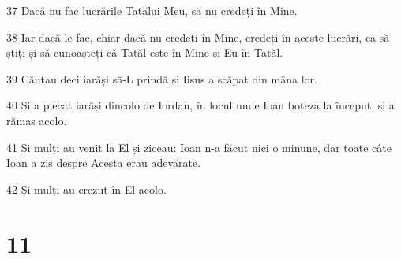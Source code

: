\par 37 Dacă nu fac lucrările Tatălui Meu, să nu credeți în Mine.
\par 38 Iar dacă le fac, chiar dacă nu credeți în Mine, credeți în aceste lucrări, ca să știți și să cunoașteți că Tatăl este în Mine și Eu în Tatăl.
\par 39 Căutau deci iarăși să-L prindă și Iisus a scăpat din mâna lor.
\par 40 Și a plecat iarăși dincolo de Iordan, în locul unde Ioan boteza la început, și a rămas acolo.
\par 41 Și mulți au venit la El și ziceau: Ioan n-a făcut nici o minune, dar toate câte Ioan a zis despre Acesta erau adevărate.
\par 42 Și mulți au crezut în El acolo.

\chapter{11}

